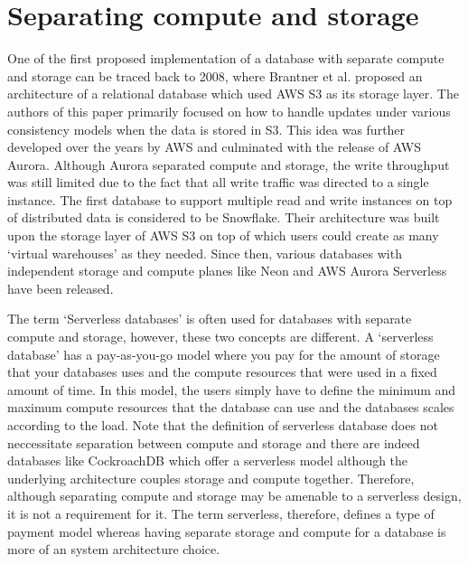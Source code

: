 \section{Separating compute and storage}\label{sec:serverlessArch}
One of the first proposed implementation of a database with separate compute and
storage can be traced back to 2008\cite{brantner2008building}, where Brantner et
al. proposed an architecture of a relational database which used AWS S3 as its
storage layer. The authors of this paper primarily focused on how to handle
updates under various consistency models when the data is stored in S3. This
idea was further developed over the years by AWS and culminated with the release
of AWS Aurora\cite{verbitski2017amazon}. Although Aurora separated compute and
storage, the write throughput was still limited due to the fact that all write
traffic was directed to a single instance. The first database to support
multiple read and write instances on top of distributed data is considered to be
Snowflake\cite{dageville2016snowflake}. Their architecture was built upon the
storage layer of AWS S3 on top of which users could create as many `virtual
warehouses' as they needed. Since then, various databases with independent
storage and compute planes like Neon\cite{neonPostgres} and AWS Aurora
Serverless\cite{auroraServerless} have been released.

\medskip
The term `Serverless databases' is often used for databases with separate
compute and storage, however, these two concepts are different. A `serverless
database' has a pay-as-you-go model where you pay for the amount of storage that
your databases uses and the compute resources that were used in a fixed amount
of time. In this model, the users simply have to define the minimum and maximum
compute resources that the database can use and the databases scales according
to the load. Note that the definition of serverless database does not
neccessitate separation between compute and storage and there are indeed
databases like CockroachDB\cite{taft2020cockroachdb} which offer a serverless
model although the underlying architecture couples storage and compute together.
Therefore, although separating compute and storage may be amenable to a
serverless design, it is not a requirement for it. The term serverless,
therefore, defines a type of payment model whereas having separate storage and
compute for a database is more of an system architecture choice. 

